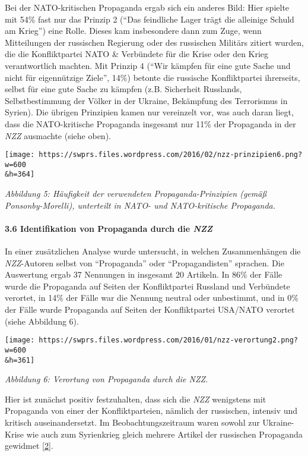 Bei der NATO-kritischen Propaganda ergab sich ein anderes Bild: Hier
spielte mit 54\% fast nur das Prinzip 2 (``Das feindliche Lager trägt
die alleinige Schuld am Krieg'') eine Rolle. Dieses kam insbesondere
dann zum Zuge, wenn Mitteilungen der russischen Regierung oder des
russischen Militärs zitiert wurden, die die Konfliktpartei NATO \&
Verbündete für die Krise oder den Krieg verantwortlich machten. Mit
Prinzip 4 (``Wir kämpfen für eine gute Sache und nicht für eigennützige
Ziele'', 14\%) betonte die russische Konfliktpartei ihrerseits, selbst
für eine gute Sache zu kämpfen (z.B. Sicherheit Russlands,
Selbstbestimmung der Völker in der Ukraine, Bekämpfung des Terrorismus
in Syrien). Die übrigen Prinzipien kamen nur vereinzelt vor, was auch
daran liegt, dass die NATO-kritische Propaganda insgesamt nur 11\% der
Propaganda in der \emph{NZZ} ausmachte (siehe oben).

\texttt{[image: https://swprs.files.wordpress.com/2016/02/nzz-prinzipien6.png?w=600\\\&h=364]}

\emph{Abbildung 5: Häufigkeit der verwendeten Propaganda-Prinzipien
(gemäß Ponsonby-Morelli), unterteilt in NATO- und NATO-kritische
Propaganda.}

\hypertarget{36-identifikation-von-propaganda-durch-die-nzz}{%
\paragraph{\texorpdfstring{3.6 Identifikation von Propaganda durch die
\emph{NZZ}}{3.6 Identifikation von Propaganda durch die NZZ}}\label{36-identifikation-von-propaganda-durch-die-nzz}}

In einer zusätzlichen Analyse wurde untersucht, in welchen
Zusammenhängen die \emph{NZZ}-Autoren selbst von ``Propaganda'' oder
``Propagandisten'' sprachen. Die Auswertung ergab 37 Nennungen in
insgesamt 20 Artikeln. In 86\% der Fälle wurde die Propaganda auf Seiten
der Konfliktpartei Russland und Verbündete verortet, in 14\% der Fälle
war die Nennung neutral oder unbestimmt, und in 0\% der Fälle wurde
Propaganda auf Seiten der Konfliktpartei USA/NATO verortet (siehe
Abbildung 6).

\texttt{[image: https://swprs.files.wordpress.com/2016/01/nzz-verortung2.png?w=600\\\&h=361]}

\emph{Abbildung 6: Verortung von Propaganda durch die NZZ.}

Hier ist zunächst positiv festzuhalten, dass sich die \emph{NZZ}
wenigstens mit Propaganda von einer der Konfliktparteien, nämlich der
russischen, intensiv und kritisch auseinandersetzt. Im
Beobachtungs­zeitraum waren sowohl zur Ukraine-Krise wie auch zum
Syrienkrieg gleich mehrere Artikel der russischen Propaganda gewidmet
{[}\protect\hyperlink{anm2}{2}{]}.

